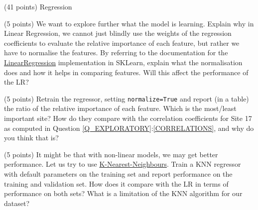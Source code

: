 \documentclass[12pt]{article}
\begin{document}
\begin{question}{\label{Q_LR_BA}(41 points) Regression}
\begin{subquestion}



\end{subquestion}



\begin{subquestion}{(5 points) We want to explore further what the model is learning. Explain why in Linear Regression, we cannot just blindly use the weights of the regression coefficients to evaluate the relative importance of each feature, but rather we have to normalise the features. By referring to the documentation for the \href{http://scikit-learn.org/stable/modules/generated/sklearn.linear_model.LinearRegression.html}{LinearRegression} implementation in SKLearn, explain what the normalisation does and how it helps in comparing features. Will this affect the performance of the LR?}






\end{subquestion}

\begin{subquestion}{(5 points) Retrain the regressor, setting \texttt{normalize=True} and report (in a table) the ratio of the relative importance of each feature. Which is the most/least important site? How do they compare with the correlation coefficients for Site 17 as computed in Question \ref{Q_EXPLORATORY}:\ref{CORRELATIONS}, and why do you think that is?}






\end{subquestion}

\begin{subquestion}{(5 points) It might be that with non-linear models, we may get better performance. Let us try to use \href{https://scikit-learn.org/stable/modules/generated/sklearn.neighbors.KNeighborsRegressor.html}{K-Nearest-Neighbours}. Train a KNN regressor with default parameters on the training set and report performance on the training and validation set.  How does it compare with the LR in terms of performance on both sets? What is a limitation of the KNN algorithm for our dataset?}




\end{subquestion}
\end{question}
\end{document}
